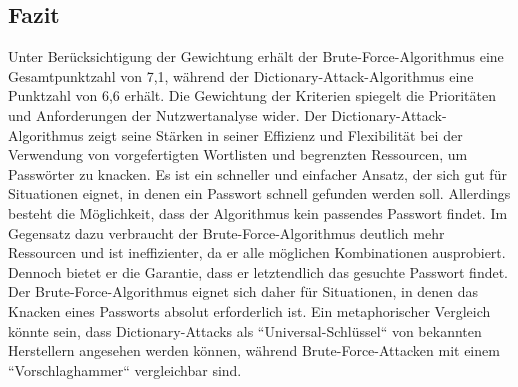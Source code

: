 \subsection{Fazit}
Unter Berücksichtigung der Gewichtung erhält der Brute-Force-Algorithmus eine Gesamtpunktzahl von 7,1, während der Dictionary-Attack-Algorithmus eine Punktzahl von 6,6 erhält. 
Die Gewichtung der Kriterien spiegelt die Prioritäten und Anforderungen der Nutzwertanalyse wider.
Der Dictionary-Attack-Algorithmus zeigt seine Stärken in seiner Effizienz und Flexibilität bei der Verwendung von vorgefertigten Wortlisten und begrenzten Ressourcen, um Passwörter zu knacken. 
Es ist ein schneller und einfacher Ansatz, der sich gut für Situationen eignet, in denen ein Passwort schnell gefunden werden soll. 
Allerdings besteht die Möglichkeit, dass der Algorithmus kein passendes Passwort findet.
Im Gegensatz dazu verbraucht der Brute-Force-Algorithmus deutlich mehr Ressourcen und ist ineffizienter, da er alle möglichen Kombinationen ausprobiert. 
Dennoch bietet er die Garantie, dass er letztendlich das gesuchte Passwort findet. 
Der Brute-Force-Algorithmus eignet sich daher für Situationen, in denen das Knacken eines Passworts absolut erforderlich ist.
Ein metaphorischer Vergleich könnte sein, dass Dictionary-Attacks als ``Universal-Schlüssel`` von bekannten Herstellern angesehen werden können, während Brute-Force-Attacken mit einem ``Vorschlaghammer`` vergleichbar sind.
